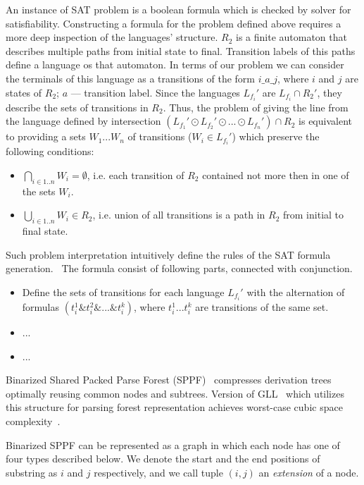 An instance of SAT problem is a boolean formula which is checked by solver for satisfiability. 
Constructing a formula for the problem defined above requires a more deep inspection of the languages' structure.
$R_2$ is a finite automaton that describes multiple paths from initial state to final. Transition labels of 
this paths define a language os that automaton. In terms of our problem we can consider the terminals of this language as 
a transitions of the form $i\_a\_j$, where $i$ and $j$ are states of $R_2$; $a$ --- transition label.
Since the languages $L_{f_i}'$ are $L_{f_i} \cap R_2'$, they describe the sets of transitions in 
$R_2$. Thus, the problem of giving the line from the language defined by intersection $(L_{f_1}' \odot L_{f_2}' \odot... \odot L_{f_n}')\cap R_2$
is equivalent to providing a sets $W_1...W_n$ of transitions ($W_i \in L_{f_i}'$) which preserve the following conditions:
\begin{itemize}
    \item $\bigcap\limits_{i\in 1..n} W_i = \emptyset$, i.e.
    each transition of $R_2$ contained not more then in one of the sets $W_i$.
    \item $\bigcup\limits_{i\in 1..n} W_i \in R_2$, i.e. union of all transitions
    is a path in $R_2$ from initial to final state. 
\end{itemize}
Such problem interpretation intuitively define the rules of the SAT formula generation.~\cite{Grigorev}
The formula consist of following parts, connected with conjunction.
\begin{itemize}
    \item Define the sets of transitions for each language $L_{f_i}'$ with the alternation
     of formulas $(t_i^1 \& t_i^2 \& ...\& t_i^k)$, where $t_i^1 ... t_i^k$ are transitions of the same set.
    \item ...
    \item ...
\end{itemize}


Binarized Shared Packed Parse Forest (SPPF)~\cite{brnglr, SPPF} compresses derivation trees optimally reusing common nodes and subtrees.
Version of GLL~\cite{scott2010gll} which utilizes this structure for parsing forest representation achieves worst-case cubic space complexity~\cite{gllParsingTree}.

Binarized SPPF can be represented as a graph in which each node has one of four types described below.
We denote the start and the end positions of substring as $i$ and $j$ respectively, and we call tuple $(i,j)$ an \textit{extension} of a node.

